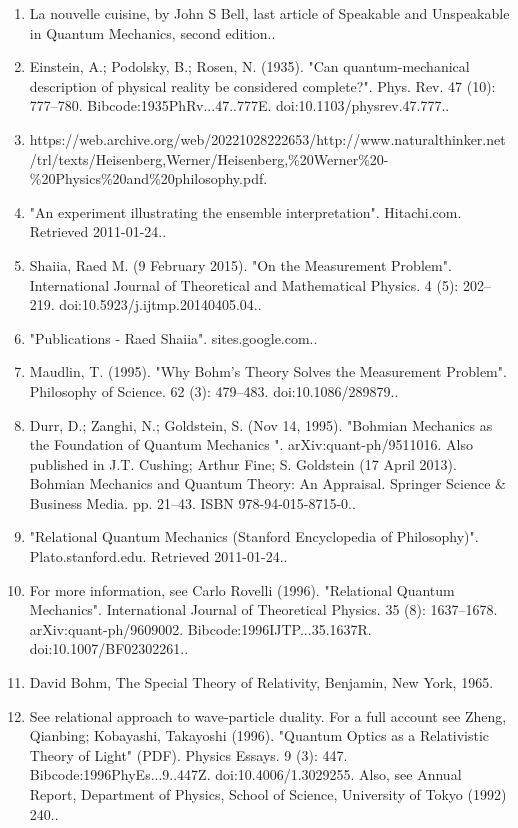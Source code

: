 \begin{enumerate}
\item La nouvelle cuisine, by John S Bell, last article of Speakable and Unspeakable in Quantum Mechanics, second edition..
\item Einstein, A.; Podolsky, B.; Rosen, N. (1935). "Can quantum-mechanical description of physical reality be considered complete?". Phys. Rev. 47 (10): 777–780. Bibcode:1935PhRv...47..777E. doi:10.1103/physrev.47.777..
\item https://web.archive.org/web/20221028222653/http://www.naturalthinker.net/trl/texts/Heisenberg,Werner/Heisenberg,\%20Werner\%20-\%20Physics\%20and\%20philosophy.pdf.
\item "An experiment illustrating the ensemble interpretation". Hitachi.com. Retrieved 2011-01-24..
\item Shaiia, Raed M. (9 February 2015). "On the Measurement Problem". International Journal of Theoretical and Mathematical Physics. 4 (5): 202–219. doi:10.5923/j.ijtmp.20140405.04..
\item "Publications - Raed Shaiia". sites.google.com..
\item Maudlin, T. (1995). "Why Bohm's Theory Solves the Measurement Problem". Philosophy of Science. 62 (3): 479–483. doi:10.1086/289879..
\item Durr, D.; Zanghi, N.; Goldstein, S. (Nov 14, 1995). "Bohmian Mechanics as the Foundation of Quantum Mechanics ". arXiv:quant-ph/9511016. Also published in J.T. Cushing; Arthur Fine; S. Goldstein (17 April 2013). Bohmian Mechanics and Quantum Theory: An Appraisal. Springer Science & Business Media. pp. 21–43. ISBN 978-94-015-8715-0..
\item "Relational Quantum Mechanics (Stanford Encyclopedia of Philosophy)". Plato.stanford.edu. Retrieved 2011-01-24..
\item For more information, see Carlo Rovelli (1996). "Relational Quantum Mechanics". International Journal of Theoretical Physics. 35 (8): 1637–1678. arXiv:quant-ph/9609002. Bibcode:1996IJTP...35.1637R. doi:10.1007/BF02302261..
\item David Bohm, The Special Theory of Relativity, Benjamin, New York, 1965.
\item See relational approach to wave-particle duality. For a full account see Zheng, Qianbing; Kobayashi, Takayoshi (1996). "Quantum Optics as a Relativistic Theory of Light" (PDF). Physics Essays. 9 (3): 447. Bibcode:1996PhyEs...9..447Z. doi:10.4006/1.3029255. Also, see Annual Report, Department of Physics, School of Science, University of Tokyo (1992) 240..

\end{enumerate}
